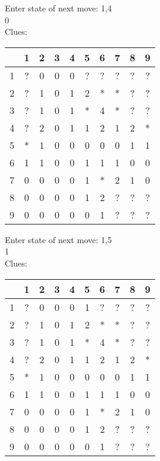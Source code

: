 Enter state of next move: 1,4\\
0\\
Clues:\\
\begin{tabular}{|c|c|c|c|c|c|c|c|c|c|}
\hline
  & 1 & 2 & 3 & 4 & 5 & 6 & 7 & 8 & 9\\
\hline
1 & ? & 0 & 0 & 0 & ? & ? & ? & ? & ?\\
\hline
2 & ? & 1 & 0 & 1 & 2 & * & * & ? & ?\\
\hline
3 & ? & 1 & 0 & 1 & * & 4 & * & ? & ?\\
\hline
4 & ? & 2 & 0 & 1 & 1 & 2 & 1 & 2 & *\\
\hline
5 & * & 1 & 0 & 0 & 0 & 0 & 0 & 1 & 1\\
\hline
6 & 1 & 1 & 0 & 0 & 1 & 1 & 1 & 0 & 0\\
\hline
7 & 0 & 0 & 0 & 0 & 1 & * & 2 & 1 & 0\\
\hline
8 & 0 & 0 & 0 & 0 & 1 & 2 & ? & ? & ?\\
\hline
9 & 0 & 0 & 0 & 0 & 0 & 1 & ? & ? & ?\\
\hline
\end{tabular}

Enter state of next move: 1,5\\
1\\
Clues:\\
\begin{tabular}{|c|c|c|c|c|c|c|c|c|c|}
\hline
  & 1 & 2 & 3 & 4 & 5 & 6 & 7 & 8 & 9\\
\hline
1 & ? & 0 & 0 & 0 & 1 & ? & ? & ? & ?\\
\hline
2 & ? & 1 & 0 & 1 & 2 & * & * & ? & ?\\
\hline
3 & ? & 1 & 0 & 1 & * & 4 & * & ? & ?\\
\hline
4 & ? & 2 & 0 & 1 & 1 & 2 & 1 & 2 & *\\
\hline
5 & * & 1 & 0 & 0 & 0 & 0 & 0 & 1 & 1\\
\hline
6 & 1 & 1 & 0 & 0 & 1 & 1 & 1 & 0 & 0\\
\hline
7 & 0 & 0 & 0 & 0 & 1 & * & 2 & 1 & 0\\
\hline
8 & 0 & 0 & 0 & 0 & 1 & 2 & ? & ? & ?\\
\hline
9 & 0 & 0 & 0 & 0 & 0 & 1 & ? & ? & ?\\
\hline
\end{tabular}


